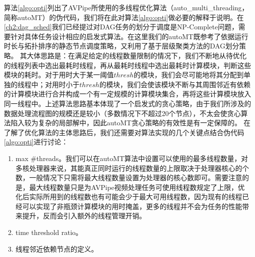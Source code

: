算法\ref{algo:opti}列出了AVPipe所使用的多线程优化算法（auto\_multi\_threading，简称autoMT）的伪代码，我们将在此对算法\ref{algo:opti}做必要的解释于说明。在\ref{ch2:dag_sched}我们已经提过对DAG任务的划分于调度是NP-Complete问题，需要针对具体任务设计相应的启发式算法。在这里我们的autoMT既参考了依据运行时长与拓扑排序的静态节点调度策略，又利用了基于层级聚类方法的DAG划分策略。
其大体思路是：在满足给定的线程数量限制的情况下，我们不断地从待优化的线程列表中选出最耗时线程，再从最耗时线程中选出最耗时计算模块，判断这些模块的耗时。对于用时大于某一阈值$thresh$的模块，我们会尽可能地将其分配到单独的线程中；对用时小于$thresh$的模块，我们会使该模块不断与其周围邻近有依赖的计算模块进行合并构成一个有一定规模的计算模块集合，再将这些计算模块放入同一线程中。上述算法思路基本体现了一个启发式的贪心策略，由于我们所涉及的数据处理流程图的规模还是较小（多数情况下不超过20个节点），不太会使贪心算法陷入较为复杂的局部解中，因此autoMT贪心策略的有效性是有一定保障的。
在了解了优化算法的主体思路后，我们还需要对算法实现的几个关键点结合伪代码\ref{algo:opti}进行讨论：
\begin{enumerate}[wide]
    \item max \#threads。我们可以在autoMT算法中设置可以使用的最多线程数量，对多核处理器来说，其能真正同时运行的线程数量的上限取决于处理器核心的个数，一般情况下只需将最大线程数量设置为处理器的核心数即可。需要注意的是，最大线程数量只是为AVPipe视频处理任务可使用线程数规定了上限，优化后实际所用到的线程数也有可能会少于最大可用线程数，因为现有的线程已经可以实现了非瓶颈计算模块的用时掩盖，更多的线程并不会为任务的性能带来提升，反而会引入额外的线程管理开销。
    \item time threshold ratio。
    \item 线程邻近依赖节点的定义。
\end{enumerate}


